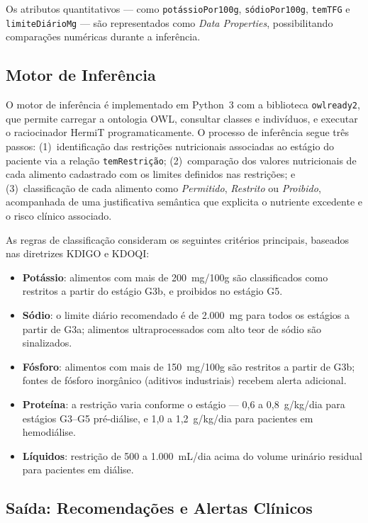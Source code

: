 \documentclass[12pt, a4paper, twocolumn]{article}
\begin{document}
Os atributos quantitativos --- como \texttt{potássioPor100g}, \texttt{sódioPor100g}, \texttt{temTFG} e \texttt{limiteDiárioMg} --- são representados como \textit{Data Properties}, possibilitando comparações numéricas durante a inferência.

    \subsection{Motor de Inferência}

O motor de inferência é implementado em Python~3 com a biblioteca \texttt{owlready2}, que permite carregar a ontologia OWL, consultar classes e indivíduos, e executar o raciocinador HermiT programaticamente. O processo de inferência segue três passos: (1)~identificação das restrições nutricionais associadas ao estágio do paciente via a relação \texttt{temRestrição}; (2)~comparação dos valores nutricionais de cada alimento cadastrado com os limites definidos nas restrições; e (3)~classificação de cada alimento como \textit{Permitido}, \textit{Restrito} ou \textit{Proibido}, acompanhada de uma justificativa semântica que explicita o nutriente excedente e o risco clínico associado.

As regras de classificação consideram os seguintes critérios principais, baseados nas diretrizes KDIGO e KDOQI:

\begin{itemize}
    \item \textbf{Potássio}: alimentos com mais de 200~mg/100g são classificados como restritos a partir do estágio G3b, e proibidos no estágio G5.
    \item \textbf{Sódio}: o limite diário recomendado é de 2.000~mg para todos os estágios a partir de G3a; alimentos ultraprocessados com alto teor de sódio são sinalizados.
    \item \textbf{Fósforo}: alimentos com mais de 150~mg/100g são restritos a partir de G3b; fontes de fósforo inorgânico (aditivos industriais) recebem alerta adicional.
    \item \textbf{Proteína}: a restrição varia conforme o estágio --- 0,6 a 0,8~g/kg/dia para estágios G3--G5 pré-diálise, e 1,0 a 1,2~g/kg/dia para pacientes em hemodiálise.
    \item \textbf{Líquidos}: restrição de 500 a 1.000~mL/dia acima do volume urinário residual para pacientes em diálise.
\end{itemize}

    \subsection{Saída: Recomendações e Alertas Clínicos}
\end{document}
